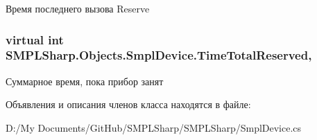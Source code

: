 Время последнего вызова Reserve 

\hypertarget{class_s_m_p_l_sharp_1_1_objects_1_1_smpl_device_afe478b9c4ec74e462f5af5d3a51f4131}{
\subsubsection[{Time\-Total\-Reserved}]{\setlength{\rightskip}{0pt plus 5cm}virtual int S\-M\-P\-L\-Sharp.\-Objects.\-Smpl\-Device.\-Time\-Total\-Reserved\hspace{0.3cm}{\ttfamily [get]}, {\ttfamily [set]}}}\label{d7/d39/class_s_m_p_l_sharp_1_1_objects_1_1_smpl_device_afe478b9c4ec74e462f5af5d3a51f4131}


Суммарное время, пока прибор занят 



Объявления и описания членов класса находятся в файле\-:\begin{DoxyCompactItemize}
\item 
D\-:/\-My Documents/\-Git\-Hub/\-S\-M\-P\-L\-Sharp/\-S\-M\-P\-L\-Sharp/Smpl\-Device.\-cs\end{DoxyCompactItemize}
